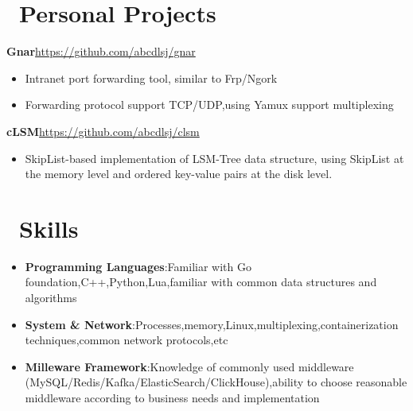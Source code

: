 \documentclass{resume}
\newcommand{\en}[1]{#1}
\newcommand{\zh}[1]{}
\begin{document}
\section{\faGithubAlt\ \en{Personal Projects}\zh{Personal}}
{\textbf{\en{Gnar}\zh{Gnar}}}\hfill{\url{https://github.com/abcdlsj/gnar}}
\begin{itemize}[parsep=0.6ex]
      \item \en{Intranet port forwarding tool, similar to Frp/Ngork}
            \zh{内网端口转发工具,类似于 Frp/Ngork}
      \item \en{Forwarding protocol support TCP/UDP,using Yamux support multiplexing}
            \zh{转发协议支持 TCP/UDP,使用 Yamux 支持多路复用}
\end{itemize}

{\textbf{\en{cLSM}\zh{cLSM}}}\hfill{\url{https://github.com/abcdlsj/clsm}}
\begin{itemize}[parsep=0.6ex]
      \item \en{SkipList-based implementation of LSM-Tree data structure, using SkipList at the memory level and ordered key-value pairs at the disk level.}
            \zh{基于 SkipList 的 LSM-Tree 数据结构实现}
\end{itemize}

\section{\faCogs\ \en{Skills}\zh{技能}}
\begin{itemize}[parsep=0.6ex]
      \item \en{\textbf{Programming Languages}:Familiar with Go foundation,C++,Python,Lua,familiar with common data structures and algorithms}
            \zh{\textbf{编程语言}:熟悉 Go,了解 C++、Python、Lua,熟悉常用数据结构与算法}
      \item \en{\textbf{System \& Network}:Processes,memory,Linux,multiplexing,containerization techniques,common network protocols,etc}
            \zh{\textbf{系统 \& 网络}:进程、内存、Linux、多路复用、容器化技术、常见网络协议等}
      \item \en{\textbf{Milleware Framework}:Knowledge of commonly used middleware (MySQL/Redis/Kafka/ElasticSearch/ClickHouse),ability to choose reasonable middleware according to business needs and implementation}
            \zh{\textbf{中间件}:了解常用中间件及组件(MySQL/Redis/Kafka/ElasticSearch/ClickHouse),能根据业务需求选择合理的中间件并接入}
\end{itemize}
\end{document}
